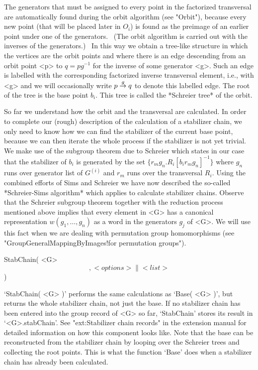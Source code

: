 The generators that  must be assigned  to every  point in the  factorized
transversal are  automatically  found  during the   orbit algorithm  (see
"Orbit"), because every new point (that will be placed later in $O_i$) is
found as the preimage of an earlier point under  one of the generators. \
(The orbit algorithm is carried out with the inverses of the generators.)
\ In this way we obtain  a tree-like structure in  which the vertices are
the  orbit points and where  there  is an edge  descending  from an orbit
point <p> to  $q=pg^{-1}$ for the inverse of  some generator <g>. Such an
edge is labelled with   the corresponding factorized inverse  transversal
element, i.e., with <g> and we will occasionally write $p\labelto g q$ to
denote this labelled edge. The root of the  tree is the base point $b_i$.
This tree is called the *Schreier tree* of the orbit.

So far we understand how the orbit and the transversal are calculated. In
order  to  complete  our  (rough) description  of  the  calculation  of a
stabilizer chain, we only need to know how  we can find the stabilizer of
the current base point, because we can then  iterate the whole process if
the  stabilizer is not yet trivial.  We make use  of the subgroup theorem
due to Schreier which states in our case that  the stabilizer of $b_i$ is
generated by the set $\{  r_mg_n.  R_i[b_i{r_mg_n}]^{-1} \}$ where  $g_n$
runs over generator list of $G^{(i)}$ and $r_m$ runs over the transversal
$R_i$.  Using   the combined efforts of   Sims  and Schreier we  have now
described the so-called *Schreier-Sims algorithm* which {\GAP} applies to
calculate stabilizer chains. Observe  that the Schreier subgroup  theorem
together with the reduction   process mentioned above implies that  every
element in <G> has a canonical representation $w(g_1,  \ldots, g_n)$ as a
word in the  generators $g_j$ of <G>.  We will use  this fact when we are
dealing    with          permutation    group       homomorphisms    (see
"GroupGeneralMappingByImages!for permutation groups").

\>StabChain( <G> \[, <options> \| <list> \] )

`StabChain( <G> )' performs  the same calculations  as `Base( <G> )', but
returns the whole stabilizer  chain, not just  the base. If no stabilizer
chain has been entered into  the group record  of <G> so far, `StabChain'
stores its result in `<G>.stabChain'.  See "ext:Stabilizer chain records"
in  the extension manual for  detailed information on  how this component
looks like. Note that  the base can  be reconstructed from the stabilizer
chain by looping over the Schreier  trees and collecting the root points.
This is what the function `Base' does when a stabilizer chain has already
been calculated.

